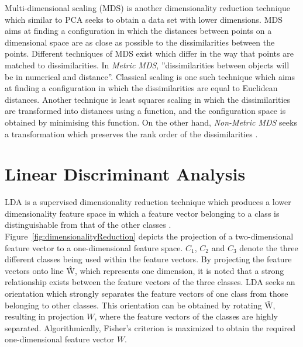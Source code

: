 Multi-dimensional scaling (MDS) is another dimensionality reduction technique which similar to PCA seeks to obtain a data set with lower dimensions. MDS aims at finding a configuration in which the distances between points on a dimensional space are as close as possible to the dissimilarities between the points. Different techniques of MDS exist which differ in the way that points are matched to dissimilarities. In \textit{Metric MDS}, ''dissimilarities between objects will be in numerical and distance''. Classical scaling is one such technique which aims at finding a configuration in which the dissimilarities are equal to Euclidean distances. Another technique is least squares scaling in which the dissimilarities are transformed into distances using a function, and the configuration space is obtained by minimising this function. On the other hand, \textit{Non-Metric MDS} seeks a transformation which preserves the rank order of the dissimilarities \citep{cox2000multidimensional}.

\section{Linear Discriminant Analysis }

LDA is a supervised dimensionality reduction technique which produces a lower dimensionality feature space in which a feature vector belonging to a class is distinguishable from that of the other classes \citep{Sharma2015}. Figure~\ref{fig:dimensionalityReduction} depicts the projection of a two-dimensional feature vector to a one-dimensional feature space. $C_1$, $C_2$ and $C_3$ denote the three different classes being used within the feature vectors. By projecting the feature vectors onto line \^{W}, which represents one dimension, it is noted that a strong relationship exists between the feature vectors of the three classes. LDA seeks an orientation which strongly separates the feature vectors of one class from those belonging to other classes. This orientation can be obtained by rotating \^{W}, resulting in projection $W$, where the feature vectors of the classes are highly separated. Algorithmically, Fisher's criterion is maximized to obtain the required one-dimensional feature vector $W$.

